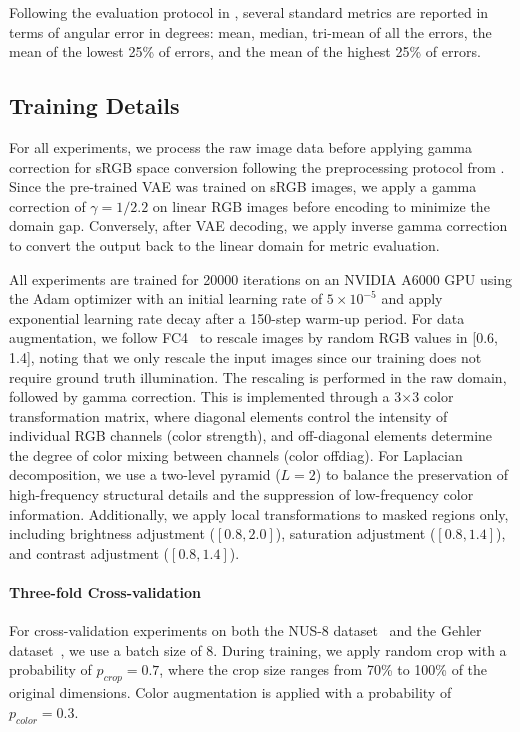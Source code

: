 Following the evaluation protocol in \cite{afifi2019sensor}, several standard metrics are reported in terms of angular error in degrees: mean, median, tri-mean of all the errors, the mean of the lowest 25\% of errors, and the mean of the highest 25\% of errors.

\subsection{Training Details}

For all experiments, we process the raw image data before applying gamma correction for sRGB space conversion following the preprocessing protocol from \cite{hu2017fc4}. Since the pre-trained VAE was trained on sRGB images, we apply a gamma correction of $\gamma = 1/2.2$ on linear RGB images before encoding to minimize the domain gap. Conversely, after VAE decoding, we apply inverse gamma correction to convert the output back to the linear domain for metric evaluation.

All experiments are trained for 20000 iterations on an NVIDIA A6000 GPU using the Adam optimizer with an initial learning rate of $5 \times 10^{-5}$ and apply exponential learning rate decay after a 150-step warm-up period. For data augmentation, we follow FC4~\cite{hu2017fc4} to rescale images by random RGB values in [0.6, 1.4], noting that we only rescale the input images since our training does not require ground truth illumination. The rescaling is performed in the raw domain, followed by gamma correction. This is implemented through a 3×3 color transformation matrix, where diagonal elements control the intensity of individual RGB channels (color strength), and off-diagonal elements determine the degree of color mixing between channels (color offdiag). For Laplacian decomposition, we use a two-level pyramid ($L = 2$) to balance the preservation of high-frequency structural details and the suppression of low-frequency color information. Additionally, we apply local transformations to masked regions only, including brightness adjustment ($[0.8, 2.0]$), saturation adjustment ($[0.8, 1.4]$), and contrast adjustment ($[0.8, 1.4]$).

\paragraph{Three-fold Cross-validation}
For cross-validation experiments on both the NUS-8 dataset~\cite{cheng2014illuminant} and the Gehler dataset~\cite{4587765}, we use a batch size of 8. During training, we apply random crop with a probability of $p_{crop} = 0.7$, where the crop size ranges from 70\% to 100\% of the original dimensions. Color augmentation is applied with a probability of $p_{color} = 0.3$.

